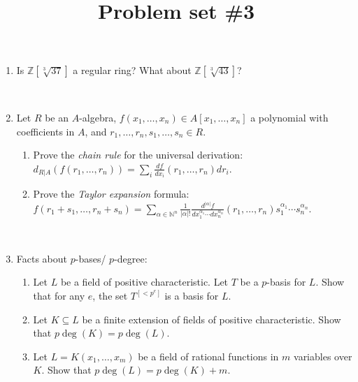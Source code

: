 \documentclass{amsart}[12pt]
\title{Problem set \#3}
\newcommand{\Z}{\mathbb{Z}}
\newcommand{\N}{\mathbb{N}}
\numberwithin{equation}{section}
\theoremstyle{plain} %
\theoremstyle{definition}
\theoremstyle{remark}
\begin{document}
\onehalfspacing

\maketitle


\vspace{-1mm}

\begin{enumerate}


\item  Is $\Z[\sqrt[3]{37}]$ a regular ring? What about $\Z[\sqrt[3]{43}]$?

\

\item Let $R$ be an $A$-algebra, $f(x_1,\dots,x_n) \in A[x_1,\dots,x_n]$ a polynomial with coefficients in $A$, and $r_1,\dots,r_n, s_1,\dots,s_n\in R$.
\begin{enumerate}
\item Prove the \emph{chain rule} for the universal derivation: $d_{R|A}(f(r_1,\dots,r_n)) = \sum_i \frac{d f}{d x_i}(r_1,\dots,r_n) dr_i$.
\item Prove the \emph{Taylor expansion} formula: $f(r_1+s_1,\dots,r_n+s_n) = \sum_{\alpha \in \N^n} \frac{1}{|\alpha|!} \frac{d^{|\alpha|}f}{dx_1^{\alpha_1} \cdots dx_n^{\alpha_n}}(r_1,\dots,r_n) s_1^{\alpha_1} \cdots s_n^{\alpha_n}$.
\end{enumerate}

\

\item Facts about $p$-bases/ $p$-degree:
 \begin{enumerate}
\item Let $L$ be a field of positive characteristic. 
Let $T$ be a $p$-basis for $L$. Show that for any $e$, the set $T^{[<p^e]}$ is a basis for $L$.
\item Let $K \subseteq L$ be a finite extension of fields of positive characteristic. Show that $p\deg(K)=p\deg(L)$.
\item Let $L=K(x_1,\dots,x_m)$ be a field of rational functions in $m$ variables over $K$. Show that $p\deg(L) = p\deg(K) +m$.
\end{enumerate}



\end{enumerate}
\end{document}
